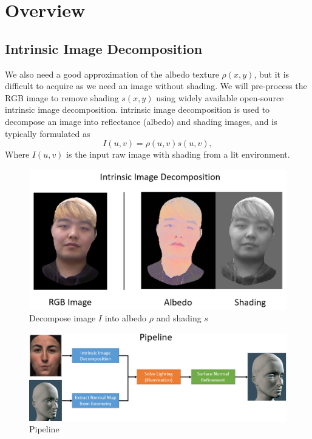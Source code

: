 \documentclass[10pt,twocolumn,letterpaper]{article}
\begin{document}
\section{Overview}
\subsection{Intrinsic Image Decomposition}
 We also need a good approximation of the albedo texture $\rho(x,y)$, but it is difficult to acquire as we need an image without shading. We will pre-process the RGB image to remove shading $s(x,y)$ using widely available open-source intrinsic image decomposition\cite{bell}. intrinsic image decomposition is used to decompose an image into reflectance (albedo) and shading images, and is typically formulated as 
\begin{equation}
I(u,v) = \rho(u,v)s(u,v),
\end{equation}
Where $I(u,v)$ is the input raw image with shading from a lit environment. 
\begin{figure}[!h]
    \begin{center}
        \includegraphics [scale=0.3] {image/intrinsic.png}
    \end{center}
    \caption{Decompose image $I$ into albedo $\rho$ and shading $s$}
    \label{fig:intrinsic}
\end{figure} 

\begin{figure}[t]
    \begin{center}
        \includegraphics [scale=0.7] {image/pipeline.png}
    \end{center}
    \caption{Pipeline}
    \label{fig:pipe1}
\end{figure} 
\end{document}
